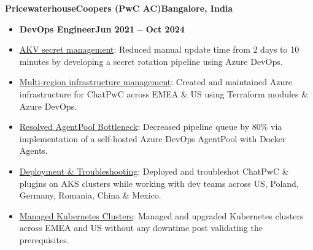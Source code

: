 \documentclass[11pt,a4paper]{article}
\newenvironment{dashlist}{
  \begin{itemize}[label={--}]
}{
  \end{itemize}
}
\begin{document}
\noindent\textbf{PricewaterhouseCoopers (PwC AC)\hfill Bangalore, India}
\begin{itemize}
\item \textbf{DevOps Engineer\hfill Jun 2021 – Oct 2024}
\end{itemize}
\begin{dashlist}
    \item \uline {AKV secret management}: Reduced manual update time from 2 days to 10 minutes by developing a secret rotation pipeline using Azure DevOps.
    \item \uline {Multi-region infrastructure management}: Created and maintained Azure infrastructure for ChatPwC across EMEA \& US using Terraform modules \& Azure DevOps.
    \item \uline {Resolved AgentPool Bottleneck}: Decreased pipeline queue by 80\% via implementation of a self-hosted Azure DevOps AgentPool with Docker Agents.
    \item \uline {Deployment \& Troubleshooting}: Deployed and troubleshot ChatPwC \& plugins on AKS clusters while working with dev teams across US, Poland, Germany, Romania, China \& Mexico.
    \item \uline {Managed Kubernetes Clusters}: Managed and upgraded Kubernetes clusters across EMEA and US without any downtime post validating the prerequisites.

\end{dashlist}
\end{document}
